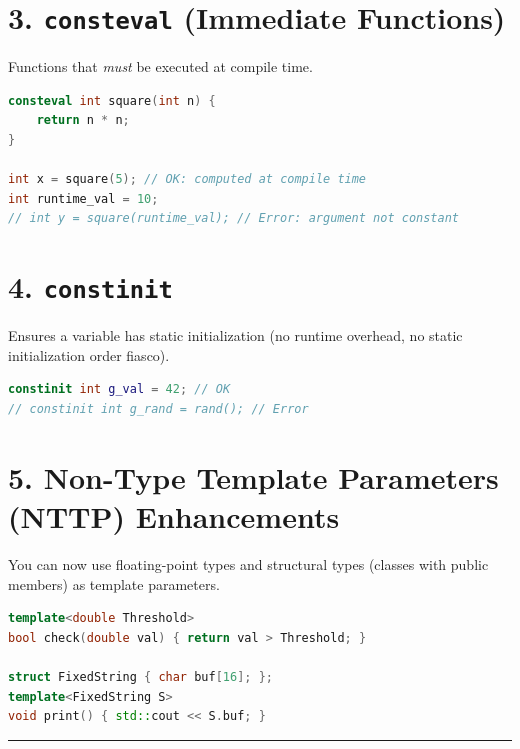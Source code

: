 \hypertarget{consteval-immediate-functions}{%
\section{\texorpdfstring{3. \texttt{consteval} (Immediate
Functions)}{3. consteval (Immediate Functions)}}\label{consteval-immediate-functions}}

Functions that \emph{must} be executed at compile time.

\begin{lstlisting}[language={C++}]
consteval int square(int n) {
    return n * n;
}

int x = square(5); // OK: computed at compile time
int runtime_val = 10;
// int y = square(runtime_val); // Error: argument not constant
\end{lstlisting}

\hypertarget{constinit}{%
\section{\texorpdfstring{4.
\texttt{constinit}}{4. constinit}}\label{constinit}}

Ensures a variable has static initialization (no runtime overhead, no
static initialization order fiasco).

\begin{lstlisting}[language={C++}]
constinit int g_val = 42; // OK
// constinit int g_rand = rand(); // Error
\end{lstlisting}

\hypertarget{non-type-template-parameters-nttp-enhancements}{%
\section{5. Non-Type Template Parameters (NTTP)
Enhancements}\label{non-type-template-parameters-nttp-enhancements}}

You can now use floating-point types and structural types (classes with
public members) as template parameters.

\begin{lstlisting}[language={C++}]
template<double Threshold>
bool check(double val) { return val > Threshold; }

struct FixedString { char buf[16]; };
template<FixedString S>
void print() { std::cout << S.buf; }
\end{lstlisting}

\begin{center}\rule{0.5\linewidth}{0.5pt}\end{center}
